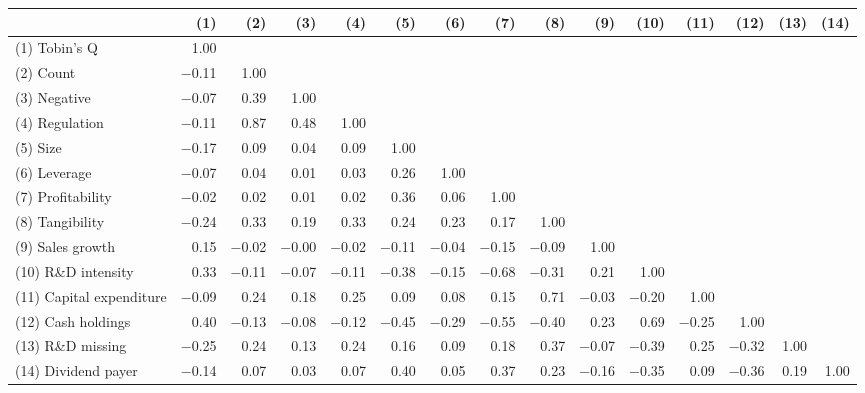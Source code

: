 \begin{tabular}{lrrrrrrrrrrrrrr}
\toprule
 & (1) & (2) & (3) & (4) & (5) & (6) & (7) & (8) & (9) & (10) & (11) & (12) & (13) & (14) \\
\midrule
(1) Tobin's Q & 1.00 &  &  &  &  &  &  &  &  &  &  &  &  &  \\
(2) Count & $-$0.11 & 1.00 &  &  &  &  &  &  &  &  &  &  &  &  \\
(3) Negative & $-$0.07 & 0.39 & 1.00 &  &  &  &  &  &  &  &  &  &  &  \\
(4) Regulation & $-$0.11 & 0.87 & 0.48 & 1.00 &  &  &  &  &  &  &  &  &  &  \\
(5) Size & $-$0.17 & 0.09 & 0.04 & 0.09 & 1.00 &  &  &  &  &  &  &  &  &  \\
(6) Leverage & $-$0.07 & 0.04 & 0.01 & 0.03 & 0.26 & 1.00 &  &  &  &  &  &  &  &  \\
(7) Profitability & $-$0.02 & 0.02 & 0.01 & 0.02 & 0.36 & 0.06 & 1.00 &  &  &  &  &  &  &  \\
(8) Tangibility & $-$0.24 & 0.33 & 0.19 & 0.33 & 0.24 & 0.23 & 0.17 & 1.00 &  &  &  &  &  &  \\
(9) Sales growth & 0.15 & $-$0.02 & $-$0.00 & $-$0.02 & $-$0.11 & $-$0.04 & $-$0.15 & $-$0.09 & 1.00 &  &  &  &  &  \\
(10) R\&D intensity & 0.33 & $-$0.11 & $-$0.07 & $-$0.11 & $-$0.38 & $-$0.15 & $-$0.68 & $-$0.31 & 0.21 & 1.00 &  &  &  &  \\
(11) Capital expenditure & $-$0.09 & 0.24 & 0.18 & 0.25 & 0.09 & 0.08 & 0.15 & 0.71 & $-$0.03 & $-$0.20 & 1.00 &  &  &  \\
(12) Cash holdings & 0.40 & $-$0.13 & $-$0.08 & $-$0.12 & $-$0.45 & $-$0.29 & $-$0.55 & $-$0.40 & 0.23 & 0.69 & $-$0.25 & 1.00 &  &  \\
(13) R\&D missing & $-$0.25 & 0.24 & 0.13 & 0.24 & 0.16 & 0.09 & 0.18 & 0.37 & $-$0.07 & $-$0.39 & 0.25 & $-$0.32 & 1.00 &  \\
(14) Dividend payer & $-$0.14 & 0.07 & 0.03 & 0.07 & 0.40 & 0.05 & 0.37 & 0.23 & $-$0.16 & $-$0.35 & 0.09 & $-$0.36 & 0.19 & 1.00 \\
\bottomrule
\end{tabular}
